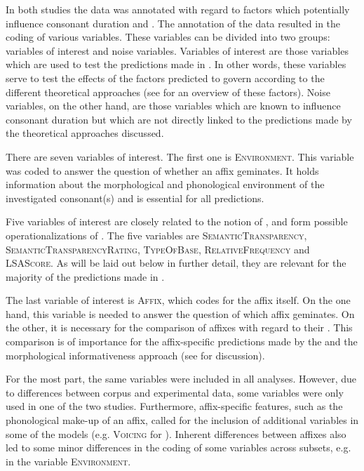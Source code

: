 In both studies the data was annotated with regard to factors which potentially influence consonant duration and . The annotation of the data resulted in the coding of various variables.
 These variables can be divided into two groups: variables of interest and noise variables. Variables of interest are those variables which are used to test the predictions made in . In other words, these variables serve to test the effects of the factors predicted to govern  according to the different theoretical approaches (see  for an overview of these factors).
Noise variables, on the other hand, are those variables which are known to influence consonant duration but which are not directly linked to the predictions made by the theoretical approaches discussed.

There are seven variables of interest. The first one is \textsc{Environment}. This variable was coded to answer the question of whether an affix {geminates}. It holds information about the morphological and phonological environment of the investigated consonant(s) and is essential for all predictions.


Five variables of interest are closely related to the notion of ,  and form possible operationalizations of . The five variables are \textsc{SemanticTransparency}, \textsc{SemanticTransparencyRating}, \textsc{TypeOfBase}, \textsc{RelativeFrequency} and \textsc{LSAScore}. As will be laid out below in further detail, they are relevant for the majority of the predictions made in . 

The last variable of interest is \textsc{Affix}, which codes for the affix itself. On the one hand, this variable is needed to answer the question of which affix {geminates}. On the other, it is necessary for the comparison of affixes with regard to their . This comparison is of importance for the affix-specific predictions made by the  and the morphological informativeness approach (see  for discussion). 

For the most part, the same variables were included in all analyses. However, due to differences between corpus and experimental data, some variables were only used in one of the two studies. 
 Furthermore, affix-specific features, such as the phonological make-up of an affix, called for the inclusion of additional variables in some of the models (e.g. \textsc{Voicing} for ). Inherent differences between affixes also led to some minor differences in the coding of some variables across subsets, e.g. in the variable \textsc{Environment}. 
 
